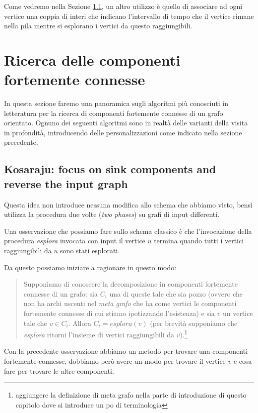 Come vedremo nella Sezione \ref{subsection:kosaraju-algorithm}, un
altro utilizzo \`e quello di associare ad ogni vertice una coppia di
interi che indicano l'intervallo di tempo che il vertice rimane nella
pila mentre si esplorano i vertici da questo raggiungibili.

\section{Ricerca delle componenti fortemente connesse}

In questa sezione faremo una panoramica sugli algoritmi pi\`u
conosciuti in letteratura per la ricerca di componenti fortemente
connesse di un grafo orientato. Ognuno dei seguenti algoritmi sono in
realt\`a delle varianti della visita in profondit\`a, introducendo
delle personalizzazioni come indicato nella sezione precedente.

\subsection{Kosaraju: focus on sink components and reverse the input
  graph}
\label{subsection:kosaraju-algorithm}
Questa idea non introduce nessuna modifica allo schema che abbiamo
visto, bens\`i utilizza la procedura due volte (\emph{two phases}) su
grafi di input differenti.

Una osservazione che possiamo fare sullo schema classico \`e che
l'invocazione della procedura \emph{esplora} invocata con input il
vertice $u$ termina quando tutti i vertici raggiungibili da $u$ sono
stati esplorati.

Da questo possiamo iniziare a ragionare in questo modo:
\begin{quotation}
  Supponiamo di conoscere la decomposizione in componenti fortemente
  connesse di un grafo: sia $C_{i}$ una di queste tale che sia pozzo
  (ovvero che non ha archi uscenti nel \emph{meta grafo} che ha come
  vertici le componenti fortemente connesse di cui stiamo ipotizzando
  l'esistenza) e sia $v$ un vertice tale che $v \in C_{i}$. Allora
  $C_{i} = esplora(v)$ (per brevit\`a supponiamo che \emph{esplora}
  ritorni l'insieme di vertici raggiungibili da $v$).\footnote{aggiungere
    la definizione di meta grafo nella parte di introduzione di questo
    capitolo dove si introduce un po di terminologia}
\end{quotation}

Con la precedente osservazione abbiamo un metodo per trovare una
componenti fortemente connesse, dobbiamo per\`o avere un modo per
trovare il vertice $v$ e cosa fare per trovare le altre componenti.

